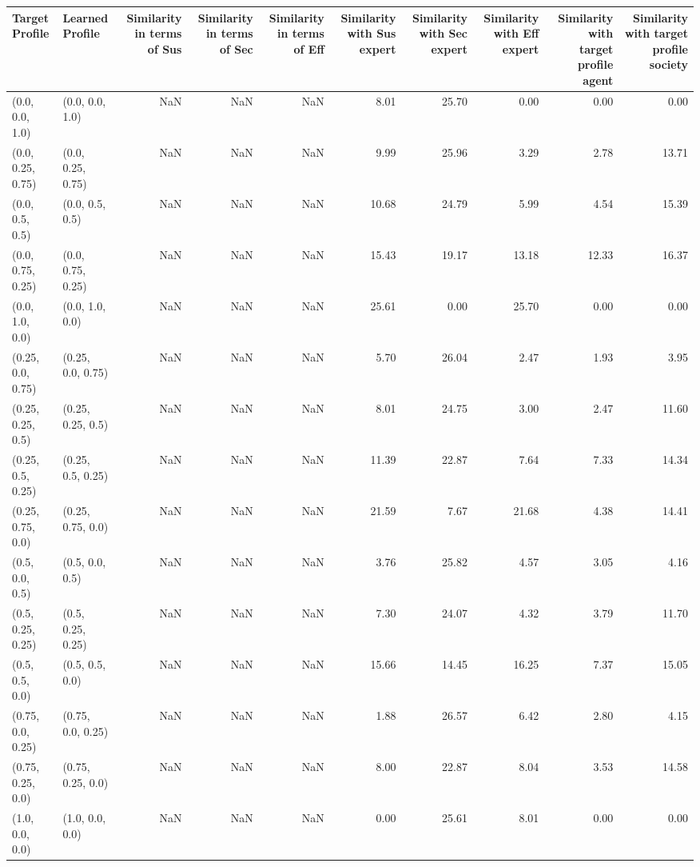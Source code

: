 \begin{tabular}{llrrrrrrrr}
\toprule
Target Profile & Learned Profile & Similarity in terms of Sus & Similarity in terms of Sec & Similarity in terms of Eff & Similarity with Sus expert & Similarity with Sec expert & Similarity with Eff expert & Similarity with target profile agent & Similarity with target profile society \\
\midrule
(0.0, 0.0, 1.0) & (0.0, 0.0, 1.0) & NaN & NaN & NaN & 8.01 & 25.70 & 0.00 & 0.00 & 0.00 \\
(0.0, 0.25, 0.75) & (0.0, 0.25, 0.75) & NaN & NaN & NaN & 9.99 & 25.96 & 3.29 & 2.78 & 13.71 \\
(0.0, 0.5, 0.5) & (0.0, 0.5, 0.5) & NaN & NaN & NaN & 10.68 & 24.79 & 5.99 & 4.54 & 15.39 \\
(0.0, 0.75, 0.25) & (0.0, 0.75, 0.25) & NaN & NaN & NaN & 15.43 & 19.17 & 13.18 & 12.33 & 16.37 \\
(0.0, 1.0, 0.0) & (0.0, 1.0, 0.0) & NaN & NaN & NaN & 25.61 & 0.00 & 25.70 & 0.00 & 0.00 \\
(0.25, 0.0, 0.75) & (0.25, 0.0, 0.75) & NaN & NaN & NaN & 5.70 & 26.04 & 2.47 & 1.93 & 3.95 \\
(0.25, 0.25, 0.5) & (0.25, 0.25, 0.5) & NaN & NaN & NaN & 8.01 & 24.75 & 3.00 & 2.47 & 11.60 \\
(0.25, 0.5, 0.25) & (0.25, 0.5, 0.25) & NaN & NaN & NaN & 11.39 & 22.87 & 7.64 & 7.33 & 14.34 \\
(0.25, 0.75, 0.0) & (0.25, 0.75, 0.0) & NaN & NaN & NaN & 21.59 & 7.67 & 21.68 & 4.38 & 14.41 \\
(0.5, 0.0, 0.5) & (0.5, 0.0, 0.5) & NaN & NaN & NaN & 3.76 & 25.82 & 4.57 & 3.05 & 4.16 \\
(0.5, 0.25, 0.25) & (0.5, 0.25, 0.25) & NaN & NaN & NaN & 7.30 & 24.07 & 4.32 & 3.79 & 11.70 \\
(0.5, 0.5, 0.0) & (0.5, 0.5, 0.0) & NaN & NaN & NaN & 15.66 & 14.45 & 16.25 & 7.37 & 15.05 \\
(0.75, 0.0, 0.25) & (0.75, 0.0, 0.25) & NaN & NaN & NaN & 1.88 & 26.57 & 6.42 & 2.80 & 4.15 \\
(0.75, 0.25, 0.0) & (0.75, 0.25, 0.0) & NaN & NaN & NaN & 8.00 & 22.87 & 8.04 & 3.53 & 14.58 \\
(1.0, 0.0, 0.0) & (1.0, 0.0, 0.0) & NaN & NaN & NaN & 0.00 & 25.61 & 8.01 & 0.00 & 0.00 \\
\bottomrule
\end{tabular}
